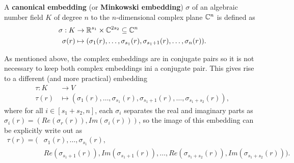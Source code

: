 \documentclass[../main.tex]{subfiles}
\begin{document}
\begin{definition}
\label{app def:canEmbd}
\reversemarginpar
{}
A \textbf{canonical embedding} (or \textbf{Minkowski embedding}) $\sigma$ of an algebraic number field $K$ of degree $n$ to the $n$-dimensional complex plane $\mathbb{C}^n$ is defined as 
\begin{align*}
    \sigma: K &\rightarrow \mathbb{R}^{s_1} \times \mathbb{C}^{2s_2} \subseteq \mathbb{C}^n \\
    \sigma(r) &\mapsto (\sigma_1(r), \dots, \sigma_{s_1}(r), \sigma_{s_1+1}(r),\dots, \sigma_n(r)).
\end{align*}
\end{definition}

As mentioned above, the complex embeddings are in conjugate pairs so it is not necessary to keep both complex embeddings ini a conjugate pair. This gives rise to a different (and more practical)
\reversemarginpar
{}
embedding  
\begin{align*}
    \tau:K &\rightarrow V\\
    \tau(r) &\mapsto (\sigma_1(r), \dots, \sigma_{s_1}(r), \sigma_{s_1+1}(r),\dots, \sigma_{s_1+s_2}(r)),
\end{align*}
where for all $i \in [s_1+s_2,n]$, each $\sigma_i$ separates the real and imaginary parts as  $\sigma_i(r)=\left(Re(\sigma_r(r)),Im(\sigma_i(r))\right)$, so the image of this embedding can be explicitly write out as  
\begin{align}
\label{app equation:minkowski embedding}
    \tau(r) = (&\sigma_1(r), \dots, \sigma_{s_1}(r), \nonumber \\  
    &Re(\sigma_{s_1+1}(r)),Im(\sigma_{s_1+1}(r)),\dots, Re(\sigma_{s_1+s_2}(r)),Im(\sigma_{s_1+s_2}(r))).
\end{align}
\end{document}
